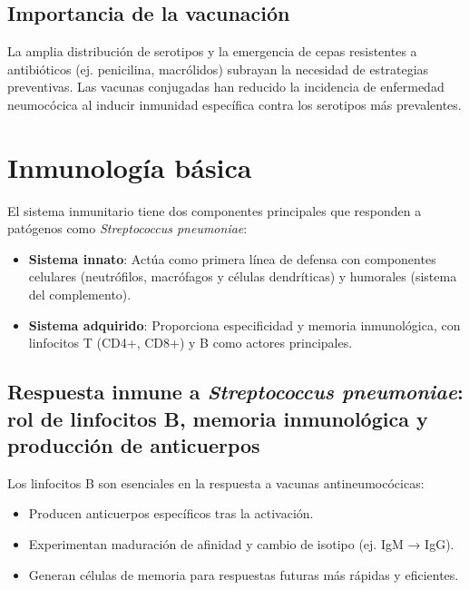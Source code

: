 \subsection{Importancia de la vacunación}
La amplia distribución de serotipos y la emergencia de cepas resistentes a antibióticos (ej. penicilina, macrólidos) subrayan la necesidad de estrategias preventivas. Las vacunas conjugadas han reducido la incidencia de enfermedad neumocócica al inducir inmunidad específica contra los serotipos más prevalentes.

\section{Inmunología básica}

El sistema inmunitario tiene dos componentes principales que responden a patógenos como \textit{Streptococcus pneumoniae}:

\begin{itemize}
    \item \textbf{Sistema innato}: Actúa como primera línea de defensa con componentes celulares (neutrófilos, macrófagos y células dendríticas) y humorales (sistema del complemento).
    
    \item \textbf{Sistema adquirido}: Proporciona especificidad y memoria inmunológica, con linfocitos T (CD4+, CD8+) y B como actores principales.
\end{itemize}

\subsection{Respuesta inmune a \textit{Streptococcus pneumoniae}: rol de linfocitos B, memoria inmunológica y producción de anticuerpos}

Los linfocitos B son esenciales en la respuesta a vacunas antineumocócicas:
\begin{itemize}
    \item Producen anticuerpos específicos tras la activación.
    \item Experimentan maduración de afinidad y cambio de isotipo (ej. IgM → IgG).
    \item Generan células de memoria para respuestas futuras más rápidas y eficientes.
\end{itemize}

